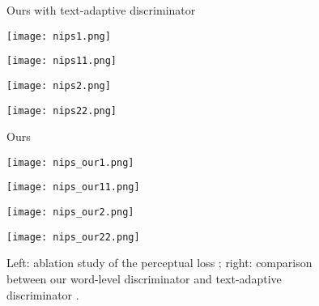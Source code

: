\documentclass{article}
\begin{document}
\begin{figure}[t]
\begin{minipage}{0.48\textwidth}
\noindent\begin{minipage}{0.184\textwidth}
\centering
\tiny{Ours with text-adaptive discriminator}
\end{minipage}
\noindent\begin{minipage}{0.184\textwidth}
\texttt{[image: nips1.png]}
\end{minipage}
\noindent\begin{minipage}{0.184\textwidth}
\texttt{[image: nips11.png]}
\end{minipage}
\noindent\begin{minipage}{0.184\textwidth}
\texttt{[image: nips2.png]}
\end{minipage}
\noindent\begin{minipage}{0.184\textwidth}
\texttt{[image: nips22.png]}
\end{minipage}

\noindent\begin{minipage}{0.184\textwidth}
\centering
\tiny{Ours}
\end{minipage}
\noindent\begin{minipage}{0.184\textwidth}
\texttt{[image: nips\_our1.png]}
\end{minipage}
\noindent\begin{minipage}{0.184\textwidth}
\texttt{[image: nips\_our11.png]}
\end{minipage}
\noindent\begin{minipage}{0.184\textwidth}
\texttt{[image: nips\_our2.png]}
\end{minipage}
\noindent\begin{minipage}{0.184\textwidth}
\texttt{[image: nips\_our22.png]}
\end{minipage}

\end{minipage}
\centering
\caption{Left: ablation study of the perceptual loss \cite{johnson2016perceptual}; right: comparison between our word-level discriminator and text-adaptive discriminator \cite{nam2018text}.}
\label{fig:abla_spm_word}
\end{figure}
\end{document}
